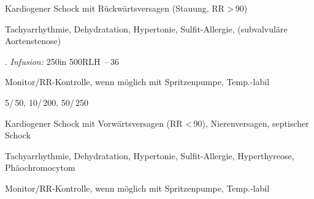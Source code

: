 {}
{}
\begin{MedikamentCharakteristika}
  \item[{\TxItemSpezialitaeten}] 
  \item[{\TxItemBeschreibung}]
  \item[{\TxItemIndikation}]
  \item[{\TxItemKontraindikation}]
  \item[Präparate:]
  \item[{\TxItemIndikation}] Kardiogener Schock mit Rückwärtsversagen
  (Stauung, RR {\textgreater}\,90)
  \item[{\TxItemKontraindikation}] Tachyarrhythmie, Dehydratation,
  Hypertonie, Sulfit-Allergie, (subvalvuläre Aortenstenose)
  \item[{\TxItemDosierung}] \Gam*.
  \textit{Infusion:} 250\Mg* in 500\Ml* RLH
  \,--\,36\,
  
  Monitor/RR-Kontrolle, wenn möglich mit Spritzenpumpe,
  Temp.-labil
  
\end{MedikamentCharakteristika}



{
\begin{MedikamentCharakteristika}
  \item[{\TxItemSpezialitaeten}] 
  5\Ml*/\,50\Mg, 10\Ml*/\,200\Mg, 50\Ml*/\,250\Mg
  \item[{\TxItemBeschreibung}]
  \item[{\TxItemIndikation}]
  \item[{\TxItemKontraindikation}]

\item[{\TxItemIndikation}] Kardiogener Schock mit Vorwärtsversagen
(RR {\textless}\,90), Nierenversagen, septischer Schock

\item[{\TxItemKontraindikation}] Tachyarrhythmie, Dehydratation, 
Hypertonie,
Sulfit-Allergie, Hyperthyreose, Phäochromocytom

\item[{\TxItemDosierung}] \Gam*

Monitor/RR-Kontrolle, wenn möglich mit Spritzenpumpe,
Temp.-labil
\end{MedikamentCharakteristika}}
{}

